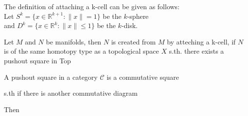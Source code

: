 \documentclass[a4paper,11pt]{article}
\begin{document}
The definition of attaching a k-cell can be given as follows: \\
Let $S^k = \{x \in \mathbb{R}^{k+1} : \lVert x \rVert = 1\}$ be the $k$-sphere \\
and $D^k = \{ x \in \mathbb{R}^k : \lVert x \rVert \leq 1 \}$ be the $k$-disk.

Let $M$ and $N$ be manifolds, then $N$ is created from $M$ by atteching a k-cell,
if $N$ is of the same homotopy type as a topological space $X$ s.th. there exists 
a pushout square in Top

\begin{figure}[H]
   \centering
\end{figure}

A pushout square in a category $\mathcal{C}$ is a commutative square 

\begin{figure}[H]
   \centering
\end{figure}      
   
s.th if there is another commutative diagram

\begin{figure}[H]
   \centering
\end{figure}

Then 

\begin{figure}[H]
   \centering
\end{figure}
\end{document}
